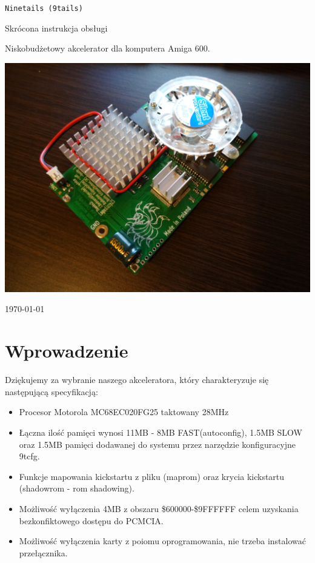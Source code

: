 \documentclass[10pt,a5paper]{article}
\begin{document}
\begin{titlepage}
\begin{center}

\huge
{\tt Ninetails (9tails)}

\Large
Skrócona instrukcja obsługi

\vspace*{2cm}

\normalsize
Niskobudżetowy akcelerator dla komputera Amiga 600.

\vspace*{2cm}
\includegraphics[scale=0.15]{ninetails-photo.jpg}
\vfill

\normalsize
\today

\end{center}
\end{titlepage}

\section*{Wprowadzenie}

Dziękujemy za wybranie naszego akceleratora, który charakteryzuje się następującą specyfikacją:

\begin{itemize}
	\item Procesor Motorola MC68EC020FG25 taktowany 28MHz
	\item Łączna ilość pamięci wynosi 11MB - 8MB FAST(autoconfig), 1.5MB SLOW oraz 1.5MB pamięci dodawanej do systemu przez narzędzie konfiguracyjne 9tcfg.
	\item Funkcje mapowania kickstartu z pliku (maprom) oraz krycia kickstartu (shadowrom - rom shadowing).
	\item Możliwość wyłączenia 4MB z obszaru \$600000-\$9FFFFFF celem uzyskania bezkonfiktowego dostępu do PCMCIA.
	\item Możliwość wyłączenia karty z poiomu oprogramowania, nie trzeba instalować przełącznika.
\end{itemize}
\end{document}
